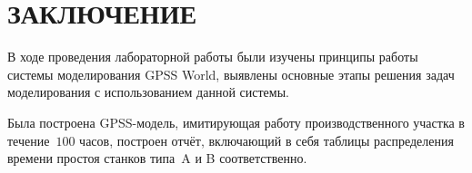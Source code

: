 \section*{ЗАКЛЮЧЕНИЕ}

В ходе проведения лабораторной работы были изучены принципы работы системы моделирования
GPSS World, выявлены основные этапы  решения задач моделирования с использованием данной системы.

Была построена GPSS-модель, имитирующая работу производственного участка
в течение~$100$ часов, построен отчёт, включающий в себя таблицы распределения
времени простоя станков типа~A и B соответственно.

\newpage
